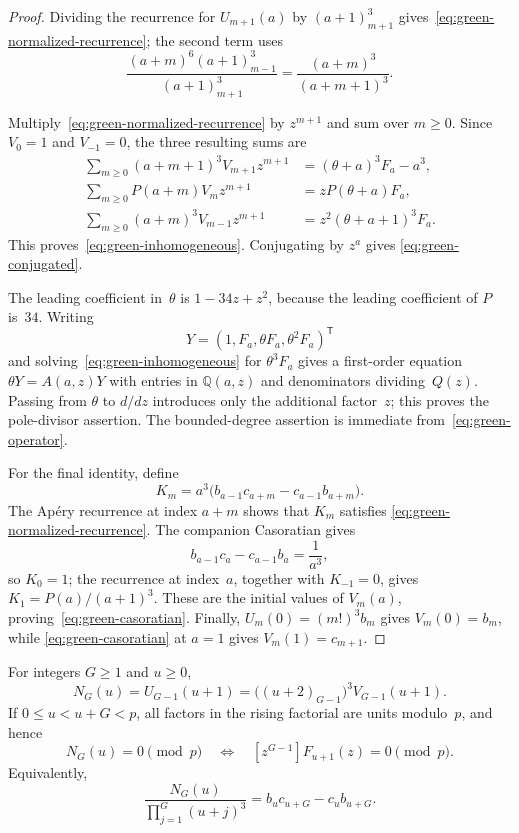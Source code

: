 \begin{proof}
Dividing the recurrence for $U_{m+1}(a)$ by
$(a+1)_{m+1}^3$ gives~\eqref{eq:green-normalized-recurrence}; the second
term uses
\[
 \frac{(a+m)^6(a+1)_{m-1}^3}{(a+1)_{m+1}^3}
 =\frac{(a+m)^3}{(a+m+1)^3}.
\]

Multiply~\eqref{eq:green-normalized-recurrence} by $z^{m+1}$ and sum over
$m\geq0$.  Since $V_0=1$ and $V_{-1}=0$, the three resulting sums are
\begin{align*}
 \sum_{m\geq0}(a+m+1)^3V_{m+1}z^{m+1}
  &=(\theta+a)^3F_a-a^3,\\
 \sum_{m\geq0}P(a+m)V_mz^{m+1}
  &=zP(\theta+a)F_a,\\
 \sum_{m\geq0}(a+m)^3V_{m-1}z^{m+1}
  &=z^2(\theta+a+1)^3F_a.
\end{align*}
This proves~\eqref{eq:green-inhomogeneous}.  Conjugating by $z^a$ gives
\eqref{eq:green-conjugated}.

The leading coefficient in~$\theta$ is
$1-34z+z^2$, because the leading coefficient of $P$ is~$34$.
Writing
\[
 Y=(1,F_a,\theta F_a,\theta^2F_a)^{\mathsf T}
\]
and solving~\eqref{eq:green-inhomogeneous} for $\theta^3F_a$ gives a
first-order equation $\theta Y=A(a,z)Y$ with entries in
$\mathbb Q(a,z)$ and denominators dividing~$Q(z)$.  Passing from
$\theta$ to $d/dz$ introduces only the additional factor~$z$; this proves
the pole-divisor assertion.  The bounded-degree assertion is immediate
from~\eqref{eq:green-operator}.

For the final identity, define
\[
 K_m=a^3\bigl(b_{a-1}c_{a+m}-c_{a-1}b_{a+m}\bigr).
\]
The Ap\'ery recurrence at index $a+m$ shows that $K_m$ satisfies
\eqref{eq:green-normalized-recurrence}.  The companion Casoratian gives
\[
 b_{a-1}c_a-c_{a-1}b_a=\frac1{a^3},
\]
so $K_0=1$; the recurrence at index~$a$, together with
$K_{-1}=0$, gives $K_1=P(a)/(a+1)^3$.  These are the initial values of
$V_m(a)$, proving~\eqref{eq:green-casoratian}.  Finally,
$U_m(0)=(m!)^3b_m$ gives $V_m(0)=b_m$, while
\eqref{eq:green-casoratian} at $a=1$ gives $V_m(1)=c_{m+1}$.
\end{proof}

\begin{corollary}
\label{cor:long-gap-green}
For integers $G\geq1$ and $u\geq0$,
\begin{equation}
 N_G(u)=U_{G-1}(u+1)
 =\bigl((u+2)_{G-1}\bigr)^3V_{G-1}(u+1).
 \label{eq:long-gap-green}
\end{equation}
If $0\leq u<u+G<p$, all factors in the rising factorial are units
modulo~$p$, and hence
\[
 N_G(u)=0\pmod p
 \quad\Longleftrightarrow\quad
 [z^{G-1}]F_{u+1}(z)=0\pmod p.
\]
Equivalently,
\[
 \frac{N_G(u)}{\prod_{j=1}^G(u+j)^3}
 =b_uc_{u+G}-c_ub_{u+G}.
\]
\end{corollary}

